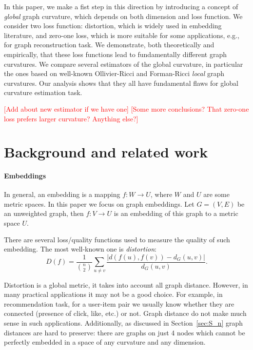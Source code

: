 \documentclass{article} %
\begin{document}
In this paper, we make a fist step in this direction by introducing a concept of \textit{global} graph curvature, which depends on both dimension and loss function. We consider two loss function: distortion, which is widely used in embedding literature, and zero-one loss, which is more suitable for some applications, e.g., for graph reconstruction task. We demonstrate, both theoretically and empirically, that these loss functions lead to fundamentally different graph curvatures. We compare several estimators of the global curvature, in particular the ones based on well-known Ollivier-Ricci and Forman-Ricci \textit{local} graph curvatures. Our analysis shows that they all have fundamental flaws for global curvature estimation task. 

\textcolor{red}{[Add about new estimator if we have one]}
\textcolor{red}{[Some more conclusions? That zero-one loss prefers larger curvature? Anything else?]}

\section{Background and related work}\label{sec:related_work}

\paragraph{Embeddings} 
In general, an embedding is a mapping $f: W \rightarrow U$, where $W$ and $U$ are some metric spaces. In this paper we focus on graph embeddings. Let $G = (V,E)$ be an unweighted graph, then $f: V \rightarrow U$ is an embedding of this graph to a metric space $U$. 

There are several loss/quality functions used to measure the quality of such embedding. The most well-known one is \textit{distortion}:
\[
D(f) = \frac{1}{\binom{n}{2}} \sum_{u \neq v}  \frac{|d(f(u),f(v)) - d_G(u,v)|}{d_G(u,v)}.
\]

Distortion is a global metric, it takes into account all graph distance. However, in many practical applications it may not be a good choice. For example, in recommendation task, for a user-item pair we usually know whether they are connected (presence of click, like, etc.) or not. Graph distance do not make much sense in such applications. Additionally, as discussed in Section~\ref{sec:S_n} graph distances are hard to preserve: there are graphs on just 4 nodes which cannot be perfectly embedded in a space of any curvature and any dimension. 
\end{document}
